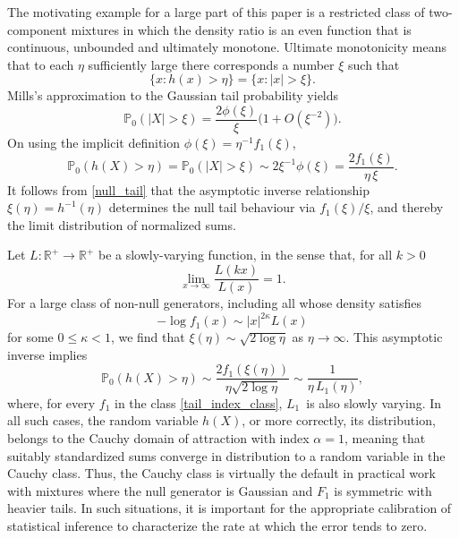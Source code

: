 \documentclass[11pt]{article}
\theoremstyle{definition}
\newcommand{\RR}{\mathbb{R}}
\def\Prob{{\mathbb P}}
\begin{document}
The motivating example for a large part of this paper is a restricted class of two-component mixtures in which
the density ratio is an even function that is continuous, unbounded and ultimately monotone.  Ultimate monotonicity means that to each $\eta$ sufficiently large there corresponds a number $\xi$ such that
\begin{equation}\label{umc}
\{x : h(x) > \eta\} = \{x : |x| > \xi\}.
\end{equation}
%
Mills's approximation to the Gaussian tail probability yields
\[
\Prob_0(|X| > \xi) = \frac{2\phi(\xi)}{\xi}\bigl(1+ O(\xi^{-2})\bigr).
\]
 On using the implicit definition $\phi(\xi) = \eta^{-1} f_1(\xi)$,
\begin{equation}\label{null_tail}
\Prob_0(h(X) > \eta) = \Prob_0(|X| > \xi) \sim 2\xi^{-1} \phi(\xi) 
=\frac{2 f_1(\xi)} {\eta\, \xi}.
\end{equation}
%
It follows from \eqref{null_tail} that the asymptotic inverse relationship $\xi(\eta) = h^{-1}(\eta)$ determines the null tail behaviour via $f_1(\xi)/\xi$,  
and thereby the limit distribution of normalized sums.


Let $L: \RR^+ \rightarrow \RR^+$ be a slowly-varying function, in the sense that, for all $k>0$
%
\begin{equation}\label{eqSlow}
\lim_{x\rightarrow \infty} \frac{L(kx)}{L(x)}=1.
\end{equation}
For a large class of non-null generators,  including all whose density satisfies
\begin{equation}\label{tail_index_class}
-\log f_1(x) \sim |x|^{2\kappa} L(x)
\end{equation}
for some $0 \le \kappa < 1$, we find that $\xi(\eta) \sim \sqrt{2\log \eta}$ as $\eta\to\infty$.
This asymptotic inverse implies
\[
\Prob_0(h(X) > \eta) \sim \frac{2f_1(\xi(\eta))} {\eta \sqrt{2\log \eta}} \sim \frac 1 {\eta\, L_1(\eta)},
\]
where, for every $f_1$ in the class \eqref{tail_index_class}, $L_1$~is also slowly varying. In all such cases, the random variable $h(X)$, or more correctly, its distribution, 
belongs to the Cauchy domain of attraction with index $\alpha=1$, meaning that suitably standardized sums converge in distribution to a random variable in the Cauchy class. Thus, the Cauchy class is virtually the default in practical
work with mixtures where the null generator is Gaussian and $F_1$ is symmetric with heavier tails. In such situations, it is important for the appropriate calibration of statistical inference to characterize the rate at which the error tends to zero.
\end{document}
